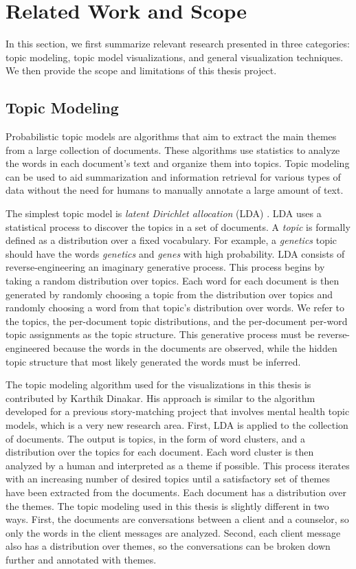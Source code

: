 \chapter{Related Work and Scope}

In this section, we first summarize relevant research presented in three categories: topic modeling, topic model visualizations, and general visualization techniques. We then provide the scope and limitations of this thesis project.

\section{Topic Modeling}

Probabilistic topic models \cite{blei-topicmodel} are algorithms that aim to extract the main themes from a large collection of documents. These algorithms use statistics to analyze the words in each document's text and organize them into topics. Topic modeling can be used to aid summarization and information retrieval for various types of data without the need for humans to manually annotate a large amount of text.

The simplest topic model is \textit{latent Dirichlet allocation} (LDA) \cite{blei-topicmodel}. LDA uses a statistical process to discover the topics in a set of documents. A \textit{topic} is formally defined as a distribution over a fixed vocabulary. For example, a \textit{genetics} topic should have the words \textit{genetics} and \textit{genes} with high probability. LDA consists of reverse-engineering an imaginary generative process. This process begins by taking a random distribution over topics. Each word for each document is then generated by randomly choosing a topic from the distribution over topics and randomly choosing a word from that topic's distribution over words. We refer to the topics, the per-document topic distributions, and the per-document per-word topic assignments as the topic structure. This generative process must be reverse-engineered because the words in the documents are observed, while the hidden topic structure that most likely generated the words must be inferred.

The topic modeling algorithm used for the visualizations in this thesis is contributed by Karthik Dinakar. His approach is similar to the algorithm developed for a previous story-matching project \cite{dinakar-mtv} that involves mental health topic models, which is a very new research area. First, LDA is applied to the collection of documents. The output is topics, in the form of word clusters, and a distribution over the topics for each document. Each word cluster is then analyzed by a human and interpreted as a theme if possible. This process iterates with an increasing number of desired topics until a satisfactory set of themes have been extracted from the documents. Each document has a distribution over the themes. The topic modeling used in this thesis is slightly different in two ways. First, the documents are conversations between a client and a counselor, so only the words in the client messages are analyzed. Second, each client message also has a distribution over themes, so the conversations can be broken down further and annotated with themes.

